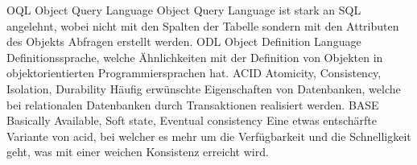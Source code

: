   {OQL}               %
  {Object Query Language}  %
  {Object Query Language ist stark an SQL angelehnt, wobei nicht mit den Spalten der Tabelle sondern mit den Attributen des Objekts 
Abfragen erstellt werden.}
  {ODL}               %
  {Object Definition Language}  %
  {Definitionssprache, welche Ähnlichkeiten mit der Definition von Objekten in objektorientierten Programmiersprachen hat.}
  {ACID}               %
  {Atomicity, Consistency, Isolation, Durability}  %
  {Häufig erwünschte Eigenschaften von Datenbanken, welche bei relationalen Datenbanken durch Transaktionen realisiert werden.}
  {BASE}               %
  {Basically Available, Soft state, Eventual consistency}  %
  {Eine etwas entschärfte Variante von \gls{acid}, bei welcher es mehr um die Verfügbarkeit und die Schnelligkeit geht, was mit einer 
weichen Konsistenz erreicht wird.}

